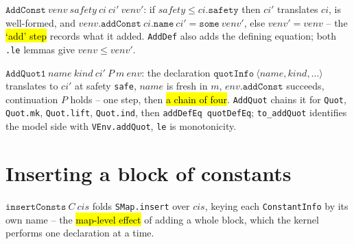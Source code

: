 \begin{definition}
\label{def:venv-add-const}
\leanok
{}

 $\mathtt{AddConst}\ venv\ safety\ ci\ ci'\ venv'$: if
$safety \le ci.\mathtt{safety}$ then $ci'$ translates $ci$, is well-formed, and
$venv.\mathtt{addConst}\ ci.\mathtt{name}\ ci' = \mathtt{some}\ venv'$, else
$venv' = venv$ -- the \hl{`add' step} records what it added. \texttt{AddDef} also adds the
defining equation; both \texttt{.le} lemmas give $venv \le venv'$.
\end{definition}

\begin{definition}
\label{def:add-quot-witness}
\leanok
{}

 $\mathtt{AddQuot1}\ name\ kind\ ci'\ P\ m\ env$: the declaration
$\mathtt{quotInfo}\ \langle name, kind, \ldots\rangle$ translates to $ci'$ at safety
\texttt{safe}, $name$ is fresh in $m$, $env.\mathtt{addConst}$ succeeds, continuation $P$
holds -- one step, then \hl{a chain of four}. \texttt{AddQuot} chains it for \texttt{Quot},
\texttt{Quot.mk}, \texttt{Quot.lift}, \texttt{Quot.ind}, then \texttt{addDefEq quotDefEq};
\texttt{to\_addQuot} identifies the model side with \texttt{VEnv.addQuot}, \texttt{le} is
monotonicity.
\end{definition}

\section{Inserting a block of constants}

\begin{definition}
\label{def:insert-consts}
\leanok
{}

 $\mathtt{insertConsts}\ C\ cis$ folds \texttt{SMap.insert} over $cis$,
keying each \texttt{ConstantInfo} by its own name -- the \hl{map-level effect} of adding a
whole block, which the kernel performs one declaration at a time.
\end{definition}

